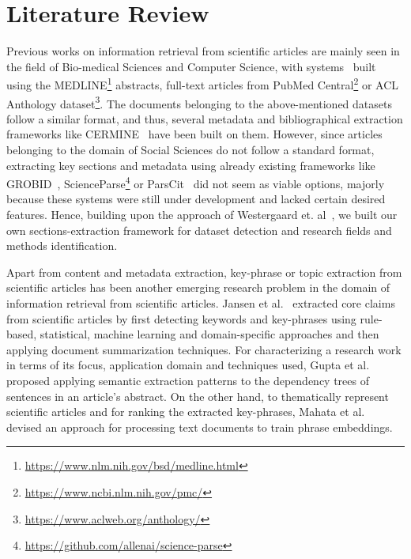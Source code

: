 \documentclass[runningheads]{llncs}
\begin{document}


\setcounter{figure}{0}
\setcounter{table}{0}

\section{Literature Review}
Previous works on information retrieval from scientific articles are mainly seen in the field of Bio-medical Sciences and Computer Science, with systems~\cite{DBLP:journals/ploscb/WestergaardSTJB18} built using the MEDLINE\footnote{\url{https://www.nlm.nih.gov/bsd/medline.html}} abstracts, full-text articles from PubMed Central\footnote{\url{https://www.ncbi.nlm.nih.gov/pmc/}} or ACL Anthology
dataset\footnote{\url{https://www.aclweb.org/anthology/}}. The documents belonging to the above-mentioned datasets follow a similar format, and thus, several metadata and bibliographical extraction frameworks like CERMINE~\cite{tkaczyk2014cermine} have been built on them. However, since articles belonging to the domain of Social Sciences do not follow a standard format, extracting key sections and metadata using already existing frameworks like GROBID~\cite{lopez2009grobid}, ScienceParse\footnote{\url{https://github.com/allenai/science-parse}} or ParsCit~\cite{councill2008parscit} did not seem as viable options, majorly because these systems were still under development and lacked certain desired features. Hence, building upon the approach of Westergaard et. al~\cite{DBLP:journals/ploscb/WestergaardSTJB18}, we built our own sections-extraction framework for dataset detection and research fields and methods identification. 

Apart from content and metadata extraction, key-phrase or topic extraction from scientific articles has been another emerging research problem in the domain of information retrieval from scientific articles. Jansen et al.~\cite{jansen2016extracting} extracted core claims from scientific articles by first detecting keywords and key-phrases using rule-based, statistical, machine learning and domain-specific approaches and then applying document summarization techniques. For characterizing a research work in terms of its focus, application domain and techniques used, Gupta et al.~\cite{gupta2011analyzing} proposed applying semantic extraction patterns to the dependency trees of sentences in an article's abstract. On the other hand, to thematically represent scientific articles and for ranking the extracted key-phrases,  Mahata et al.~\cite{mahata2018key2vec} devised an approach for processing text documents to train phrase embeddings. 
\end{document}
